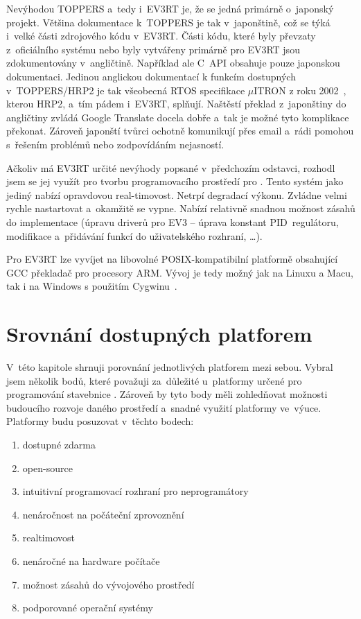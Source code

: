 Nevýhodou TOPPERS a~tedy i~EV3RT je, že se jedná primárně o~japonský projekt. 
Většina dokumentace k~TOPPERS je tak v~japonštině, což se týká i~velké části zdrojového kódu v~EV3RT. 
Části kódu, které byly převzaty z~oficiálního \lego{} systému nebo byly vytvářeny primárně pro EV3RT jsou zdokumentovány v~angličtině. 
Například ale C~API obsahuje pouze japonskou dokumentaci.
Jedinou anglickou dokumentací k funkcím dostupných v~TOPPERS/HRP2 je tak všeobecná RTOS specifikace $\mu$ITRON z roku 2002~\cite{legoProgramingPlatform_TOPPERS-IRON}, kterou HRP2, a~tím pádem i~EV3RT, splňují. %
Naštěstí překlad z~japonštiny do angličtiny zvládá Google Translate docela dobře a~tak je možné tyto komplikace překonat.
Zároveň japonští tvůrci ochotně komunikují přes email a~rádi pomohou s~řešením problémů nebo zodpovídáním nejasností.

Ačkoliv má EV3RT určité nevýhody popsané v~předchozím odstavci, rozhodl jsem se jej využít pro tvorbu programovacího prostředí pro \legoEV{}.
Tento systém jako jediný nabízí opravdovou real-timovost.
% 
% 
Netrpí degradací výkonu.
Zvládne velmi rychle nastartovat a~okamžitě se vypne. 
Nabízí relativně snadnou možnost zásahů do implementace (úpravu driverů pro EV3 -- úprava konstant PID~regulátoru, modifikace a~přidávání funkcí do uživatelského rozhraní, \dots). 

Pro EV3RT lze vyvíjet na libovolné POSIX-kompatibilní platformě obsahující GCC překladač pro procesory ARM. Vývoj je tedy možný jak na Linuxu a Macu, tak i na Windows s použitím Cygwinu~\cite{legoProgramingPlatform_EV3RT-git-web_get-started}.


\section{Srovnání dostupných platforem}
\label{lego-soft-summary}

V~této kapitole shrnuji porovnání jednotlivých platforem mezi sebou. 
Vybral jsem několik bodů, které považuji za~důležité u~platformy určené pro programování stavebnice \lego{}. 
Zároveň by tyto body měli zohledňovat možnosti budoucího rozvoje daného prostředí a~snadné využití platformy ve~výuce. \\

Platformy budu posuzovat v~těchto bodech:

\begin{enumerate}
	\item dostupné zdarma
	\item open-source
	\item intuitivní programovací rozhraní pro neprogramátory
	\item nenáročnost na počáteční zprovoznění
	\item realtimovost
	\item nenáročné na hardware počítače
	\item možnost zásahů do vývojového prostředí
	\item podporované operační systémy
\end{enumerate}


